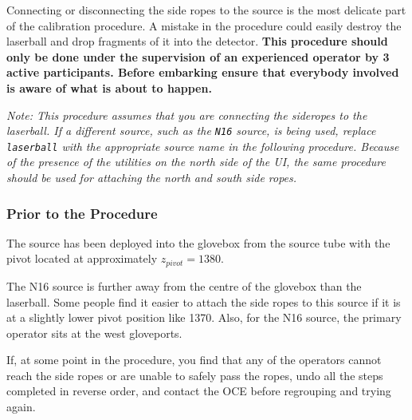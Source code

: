 Connecting or disconnecting the side ropes to the source is the most delicate part of the calibration procedure. A mistake in the procedure could easily destroy the laserball and drop fragments of it into the detector. {\bf This procedure should only be done under the supervision of an experienced operator by 3 active participants. Before embarking ensure that everybody involved is aware of what is about to happen.}

{\it Note: This procedure assumes that you are connecting the sideropes to the laserball. If a different source, such as the \verb+N16+ source, is being used, replace \verb+laserball+ with the appropriate source name in the following procedure. Because of the presence of the utilities on the north side of the UI, the same procedure should be used for attaching the north and south side ropes.}

\subsubsection{Prior to the Procedure}
The source has been deployed into the glovebox from the source tube with the pivot located at approximately $z_{pivot} = 1380$.

The N16 source is further away from the centre of the glovebox than the laserball. Some people find it easier to attach the side ropes to this source if it is at a slightly lower pivot position like 1370. Also, for the N16 source, the primary operator sits at the west gloveports.

If, at some point in the procedure, you find that any of the operators cannot reach the side ropes or are unable to safely pass the ropes, undo all the steps completed in reverse order, and contact the OCE before regrouping and trying again. 

